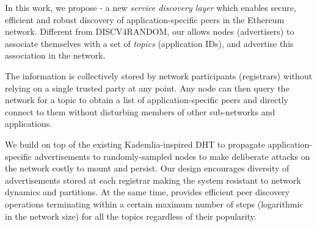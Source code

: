 


 In this work, we propose \sysname - a new \textit{service discovery layer} which enables secure, efficient and robust discovery of application-specific peers in the Ethereum network.
Different from DISCV4RANDOM, our \sysname allows nodes (\ie advertisers) to associate themselves with a set of \emph{topics} (\eg application IDs), and advertise this association in the network. 

The information is collectively stored by network participants (\ie registrars) without relying on a single trusted party at any point. Any node can then query the network for a topic to obtain a list of application-specific peers and directly connect to them without disturbing members of other sub-networks and applications. 

We build \sysname on top of the existing Kademlia-inspired DHT to propagate application-specific advertisements to randomly-sampled nodes to make deliberate attacks on the network costly to mount and persist. Our design encourages diversity of advertisements stored at each registrar making the system resistant to network dynamics and partitions. At the same time, \sysname provides efficient peer discovery operations terminating within a certain maximum number of steps (logarithmic in the network size) for all the topics regardless of their popularity. 

